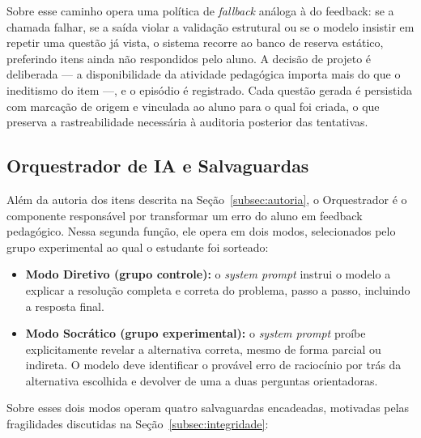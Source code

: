 \documentclass[10pt, a4paper, twocolumn]{article}
\begin{document}
Sobre esse caminho opera uma política de \textit{fallback} análoga à do
feedback: se a chamada falhar, se a saída violar a validação estrutural ou se o
modelo insistir em repetir uma questão já vista, o sistema recorre ao banco de
reserva estático, preferindo itens ainda não respondidos pelo aluno. A decisão
de projeto é deliberada --- a disponibilidade da atividade pedagógica importa
mais do que o ineditismo do item ---, e o episódio é registrado. Cada questão
gerada é persistida com marcação de origem e vinculada ao aluno para o qual foi
criada, o que preserva a rastreabilidade necessária à auditoria posterior das
tentativas.

\subsection{Orquestrador de IA e Salvaguardas}
\label{subsec:orquestrador}

Além da autoria dos itens descrita na Seção~\ref{subsec:autoria}, o Orquestrador
é o componente responsável por transformar um erro do aluno em feedback
pedagógico. Nessa segunda função, ele opera em dois modos, selecionados pelo
grupo experimental ao qual o estudante foi sorteado:

\begin{itemize}[leftmargin=0.4cm, itemsep=3pt]
    \item \textbf{Modo Diretivo (grupo controle):} o \textit{system prompt}
    instrui o modelo a explicar a resolução completa e correta do problema,
    passo a passo, incluindo a resposta final.
    \item \textbf{Modo Socrático (grupo experimental):} o \textit{system prompt}
    proíbe explicitamente revelar a alternativa correta, mesmo de forma parcial
    ou indireta. O modelo deve identificar o provável erro de raciocínio por trás
    da alternativa escolhida e devolver de uma a duas perguntas orientadoras.
\end{itemize}

Sobre esses dois modos operam quatro salvaguardas encadeadas, motivadas pelas
fragilidades discutidas na Seção~\ref{subsec:integridade}:
\end{document}
